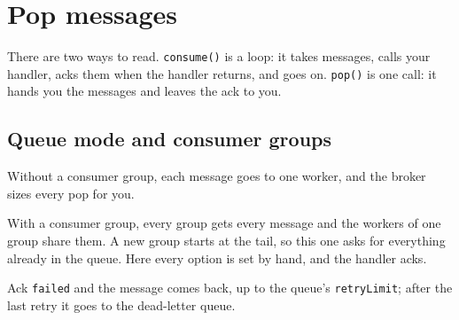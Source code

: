 
\section{Pop messages}

There are two ways to read. \texttt{consume()} is a loop: it takes messages, calls your handler,
acks them when the handler returns, and goes on. \texttt{pop()} is one call: it hands you the
messages and leaves the ack to you.



\subsection{Queue mode and consumer groups}

Without a consumer group, each message goes to one worker, and the broker sizes every pop for you.


With a consumer group, every group gets every message and the workers of one group share them. A
new group starts at the tail, so this one asks for everything already in the queue. Here every
option is set by hand, and the handler acks.


Ack \texttt{failed} and the message comes back, up to the queue's \texttt{retryLimit}; after the last retry it
goes to the dead-letter queue.



